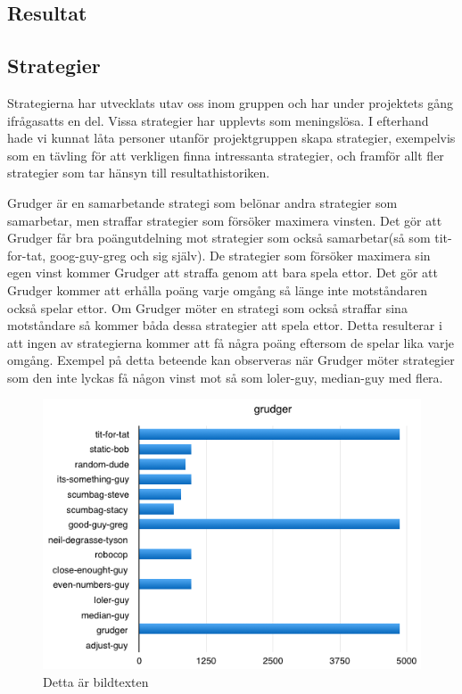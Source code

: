 \subsection{Resultat}

\subsection{Strategier}
Strategierna har utvecklats utav oss inom gruppen och har under projektets gång ifrågasatts en del. Vissa strategier har upplevts som meningslösa. I efterhand hade vi kunnat låta personer utanför projektgruppen skapa strategier, exempelvis som en tävling för att verkligen finna intressanta strategier, och framför allt fler strategier som tar hänsyn till resultathistoriken.

Grudger är en samarbetande strategi som belönar andra strategier som samarbetar, men straffar strategier som försöker maximera vinsten. Det gör att Grudger får bra poängutdelning mot strategier som också samarbetar(så som tit-for-tat, goog-guy-greg och sig själv). De strategier som försöker maximera sin egen vinst kommer Grudger att straffa genom att bara spela ettor. Det gör att Grudger kommer att erhålla poäng varje omgång så länge inte motståndaren också spelar ettor.  Om Grudger möter en strategi som också straffar sina motståndare så kommer båda dessa strategier att spela ettor. Detta resulterar i att ingen av strategierna kommer att få några poäng eftersom de spelar lika varje omgång. Exempel på detta beteende kan observeras när Grudger möter strategier som den inte lyckas få någon vinst mot så som loler-guy, median-guy med flera.

\begin{figure}[htb]
	\begin{center}
	\includegraphics[scale=0.75, angle=0]{bilder/grudger.png}
	\caption{Detta är bildtexten}
	\label{grudger}
	\end{center}
\end{figure}

